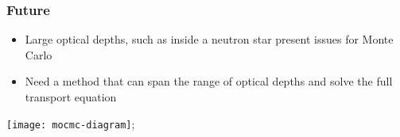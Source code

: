 \documentclass[]{beamer}
\newcommand{\backupend}{
   \setcounter{framenumber}{\value{finalframe}}
}
\begin{document}
\begin{frame}
  \frametitle{Future}
  \begin{itemize}
  \item Large optical depths, such as inside a neutron star present issues for Monte Carlo
  \item Need a method that can span the range of optical depths and solve the full transport equation
  \end{itemize}
  \begin{center}
    \texttt{[image: mocmc-diagram]};
  \end{center}
\end{frame}

\backupend
\end{document}
